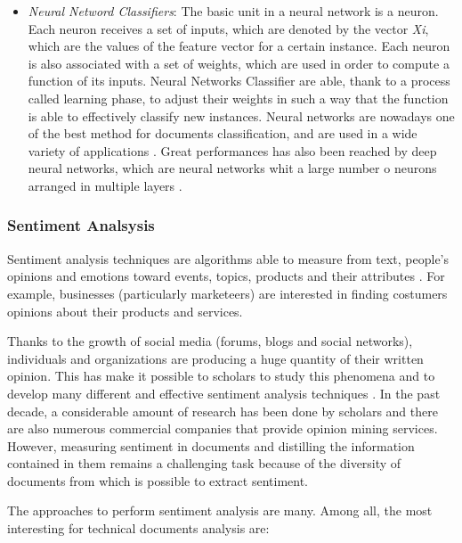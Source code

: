 \documentclass[]{book}
\begin{document}
\begin{itemize}
  \citep{pop2006approach}.
\item
  \emph{Neural Netword Classifiers}: The basic unit in a neural network
  is a neuron. Each neuron receives a set of inputs, which are denoted
  by the vector \emph{Xi}, which are the values of the feature vector
  for a certain instance. Each neuron is also associated with a set of
  weights, which are used in order to compute a function of its inputs.
  Neural Networks Classifier are able, thank to a process called
  learning phase, to adjust their weights in such a way that the
  function is able to effectively classify new instances. Neural
  networks are nowadays one of the best method for documents
  classification, and are used in a wide variety of applications
  \citep{manevitz2007one}. Great performances has also been reached by
  deep neural networks, which are neural networks whit a large number o
  neurons arranged in multiple layers
  \citep[\citet{kim2014convolutional}]{lai2015recurrent}.
\end{itemize}

\subsubsection{Sentiment Analsysis}\label{sotatoolsmodelsentanal}

Sentiment analysis techniques are algorithms able to measure from text,
people's opinions and emotions toward events, topics, products and their
attributes \citep{pang2008opinion}. For example, businesses
(particularly marketeers) are interested in finding costumers opinions
about their products and services.

Thanks to the growth of social media (forums, blogs and social
networks), individuals and organizations are producing a huge quantity
of their written opinion. This has make it possible to scholars to study
this phenomena and to develop many different and effective sentiment
analysis techniques \citep{liu2012survey}. In the past decade, a
considerable amount of research has been done by scholars and there are
also numerous commercial companies that provide opinion mining services.
However, measuring sentiment in documents and distilling the information
contained in them remains a challenging task because of the diversity of
documents from which is possible to extract sentiment.

The approaches to perform sentiment analysis are many. Among all, the
most interesting for technical documents analysis are:
\end{document}
